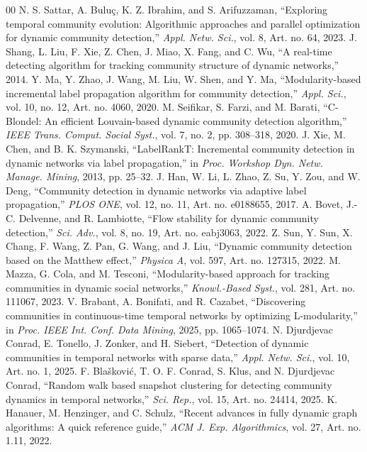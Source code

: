 \documentclass[conference]{IEEEtran}
\theoremstyle{definition}
\begin{document}
\begin{thebibliography}{00}
    N. S. Sattar, A. Bulu{\c c}, K. Z. Ibrahim, and S. Arifuzzaman, ``Exploring temporal community evolution: Algorithmic approaches and parallel optimization for dynamic community detection,'' \textit{Appl. Netw. Sci.}, vol. 8, Art. no. 64, 2023.
    J. Shang, L. Liu, F. Xie, Z. Chen, J. Miao, X. Fang, and C. Wu, ``A real-time detecting algorithm for tracking community structure of dynamic networks,'' 2014.
    Y. Ma, Y. Zhao, J. Wang, M. Liu, W. Shen, and Y. Ma, ``Modularity-based incremental label propagation algorithm for community detection,'' \textit{Appl. Sci.}, vol. 10, no. 12, Art. no. 4060, 2020.
    M. Seifikar, S. Farzi, and M. Barati, ``C-Blondel: An efficient Louvain-based dynamic community detection algorithm,'' \textit{IEEE Trans. Comput. Social Syst.}, vol. 7, no. 2, pp. 308--318, 2020.
    J. Xie, M. Chen, and B. K. Szymanski, ``LabelRankT: Incremental community detection in dynamic networks via label propagation,'' in \textit{Proc. Workshop Dyn. Netw. Manage. Mining}, 2013, pp. 25--32.
    J. Han, W. Li, L. Zhao, Z. Su, Y. Zou, and W. Deng, ``Community detection in dynamic networks via adaptive label propagation,'' \textit{PLOS ONE}, vol. 12, no. 11, Art. no. e0188655, 2017.
    A. Bovet, J.-C. Delvenne, and R. Lambiotte, ``Flow stability for dynamic community detection,'' \textit{Sci. Adv.}, vol. 8, no. 19, Art. no. eabj3063, 2022.
    Z. Sun, Y. Sun, X. Chang, F. Wang, Z. Pan, G. Wang, and J. Liu, ``Dynamic community detection based on the Matthew effect,'' \textit{Physica A}, vol. 597, Art. no. 127315, 2022.
    M. Mazza, G. Cola, and M. Tesconi, ``Modularity-based approach for tracking communities in dynamic social networks,'' \textit{Knowl.-Based Syst.}, vol. 281, Art. no. 111067, 2023.
    V. Brabant, A. Bonifati, and R. Cazabet, ``Discovering communities in continuous-time temporal networks by optimizing L-modularity,'' in \textit{Proc. IEEE Int. Conf. Data Mining}, 2025, pp. 1065--1074.
    N. Djurdjevac Conrad, E. Tonello, J. Zonker, and H. Siebert, ``Detection of dynamic communities in temporal networks with sparse data,'' \textit{Appl. Netw. Sci.}, vol. 10, Art. no. 1, 2025.
    F. Bla{\v s}kovi{\'c}, T. O. F. Conrad, S. Klus, and N. Djurdjevac Conrad, ``Random walk based snapshot clustering for detecting community dynamics in temporal networks,'' \textit{Sci. Rep.}, vol. 15, Art. no. 24414, 2025.
    K. Hanauer, M. Henzinger, and C. Schulz, ``Recent advances in fully dynamic graph algorithms: A quick reference guide,'' \textit{ACM J. Exp. Algorithmics}, vol. 27, Art. no. 1.11, 2022.

\end{thebibliography}
\end{document}
